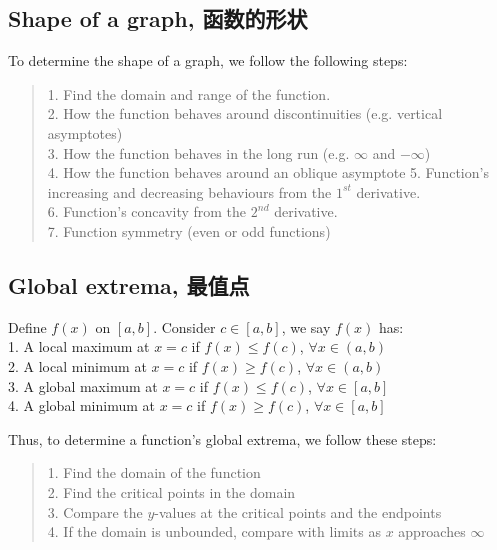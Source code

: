 \subsection{Shape of a graph, 函数的形状}
To determine the shape of a graph, we follow the following steps:
\begin{quote}
    1. Find the domain and range of the function. \\
    2. How the function behaves around discontinuities (e.g. vertical asymptotes) \\
    3. How the function behaves in the long run (e.g. $\infty$ and $-\infty$) \\
    4. How the function behaves around an oblique asymptote
    5. Function's increasing and decreasing behaviours from the $1^{st}$ derivative. \\
    6. Function's concavity from the $2^{nd}$ derivative. \\
    7. Function symmetry (even or odd functions)
\end{quote}

\subsection{Global extrema, 最值点}
\begin{definition}
    Define $f(x)$ on $[a, b]$. Consider $c \in [a, b]$, we say $f(x)$ has: \\
    1. A local maximum at $x=c$ if $f(x) \le f(c)$, $\forall x \in (a, b)$ \\
    2. A local minimum at $x=c$ if $f(x) \ge f(c)$, $\forall x \in (a, b)$ \\
    3. A global maximum at $x=c$ if $f(x) \le f(c)$, $\forall x \in [a, b]$ \\
    4. A global minimum at $x=c$ if $f(x) \ge f(c)$, $\forall x \in [a, b]$
\end{definition}
Thus, to determine a function's global extrema, we follow these steps:
\begin{quote}
    1. Find the domain of the function \\
    2. Find the critical points in the domain \\
    3. Compare the $y$-values at the critical points and the endpoints \\
    4. If the domain is unbounded, compare with limits as $x$ approaches $\infty$
\end{quote}

